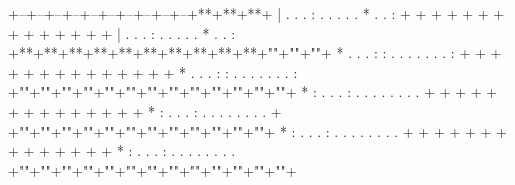 \documentclass[dvipdfmx, a4j, landscape]{jsarticle}
\begin{document}
\noindent
\begin{hogan}[cells=13*8, size=0.55cm*0.55cm]
    \begin{lines}
        +--+--+--+--+--+--+--+--+--+--+**+**+**+ %
        |  .  .  .  :  .  .  .  .  .  *  .  .  : %
        +  +  +  +  +  +  +  +  +  +  +  +  +  + %
        |  .  .  .  :  .  .  .  .  .  *  .  .  : %
        +**+**+**+**+**+**+**+**+**+**+""+""+""+ %
        *  .  .  .  :  :  .  .  .  .  .  .  .  : %
        +  +  +  +  +  +  +  +  +  +  +  +  +  + %
        *  .  .  .  :  :  .  .  .  .  .  .  .  : %
        +""+""+""+""+""+""+""+""+""+""+""+""+""+ %
        *  :  .  .  .  :  .  .  .  .  .  .  .  . %
        +  +  +  +  +  +  +  +  +  +  +  +  +  + %
        *  :  .  .  .  :  .  .  .  .  .  .  .  . %
        +  +""+""+""+""+""+""+""+""+""+""+""+""+ %
        *  :  .  .  .  :  .  .  .  .  .  .  .  . %
        +  +  +  +  +  +  +  +  +  +  +  +  +  + %
        *  :  .  .  .  :  .  .  .  .  .  .  .  . %
        +""+""+""+""+""+""+""+""+""+""+""+""+""+ %
    \end{lines}
\end{hogan}
\hfil\par
\end{document}
